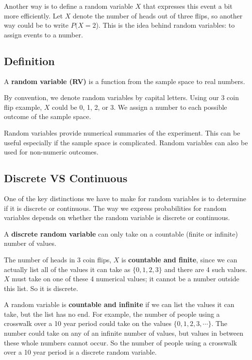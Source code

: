 \documentclass[
]{book}
\begin{document}
Another way is to define a random variable \(X\) that expresses this event a bit more efficiently. Let \(X\) denote the number of heads out of three flips, so another way could be to write \(P(X=2\)). This is the idea behind random variables: to assign events to a number.

\hypertarget{definition}{%
\subsection{Definition}\label{definition}}

A \textbf{random variable (RV)} is a function from the sample space to real numbers.

By convention, we denote random variables by capital letters. Using our 3 coin flip example, \(X\) could be 0, 1, 2, or 3. We assign a number to each possible outcome of the sample space.

Random variables provide numerical summaries of the experiment. This can be useful especially if the sample space is complicated. Random variables can also be used for non-numeric outcomes.

\hypertarget{discrete-vs-continuous}{%
\subsection{Discrete VS Continuous}\label{discrete-vs-continuous}}

One of the key distinctions we have to make for random variables is to determine if it is discrete or continuous. The way we express probabilities for random variables depends on whether the random variable is discrete or continuous.

A \textbf{discrete random variable} can only take on a countable (finite or infinite) number of values.

The number of heads in 3 coin flips, \(X\) is \textbf{countable and finite}, since we can actually list all of the values it can take as \(\{0,1,2,3 \}\) and there are 4 such values. \(X\) must take on one of these 4 numerical values; it cannot be a number outside this list. So it is discrete.

A random variable is \textbf{countable and infinite} if we can list the values it can take, but the list has no end. For example, the number of people using a crosswalk over a 10 year period could take on the values \(\{0, 1, 2, 3, \cdots \}\). The number could take on any of an infinite number of values, but values in between these whole numbers cannot occur. So the number of people using a crosswalk over a 10 year period is a discrete random variable.
\end{document}
